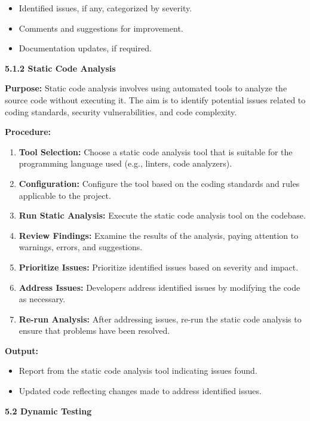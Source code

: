 \documentclass[
]{article}
\begin{document}
\begin{itemize}
\item
  Identified issues, if any, categorized by severity.
\item
  Comments and suggestions for improvement.
\item
  Documentation updates, if required.
\end{itemize}

\textbf{5.1.2 Static Code Analysis}

\textbf{Purpose:} Static code analysis involves using automated tools to
analyze the source code without executing it. The aim is to identify
potential issues related to coding standards, security vulnerabilities,
and code complexity.

\textbf{Procedure:}

\begin{enumerate}
\def\labelenumi{\arabic{enumi}.}
\item
  \textbf{Tool Selection:} Choose a static code analysis tool that is
  suitable for the programming language used (e.g., linters, code
  analyzers).
\item
  \textbf{Configuration:} Configure the tool based on the coding
  standards and rules applicable to the project.
\item
  \textbf{Run Static Analysis:} Execute the static code analysis tool on
  the codebase.
\item
  \textbf{Review Findings:} Examine the results of the analysis, paying
  attention to warnings, errors, and suggestions.
\item
  \textbf{Prioritize Issues:} Prioritize identified issues based on
  severity and impact.
\item
  \textbf{Address Issues:} Developers address identified issues by
  modifying the code as necessary.
\item
  \textbf{Re-run Analysis:} After addressing issues, re-run the static
  code analysis to ensure that problems have been resolved.
\end{enumerate}

\textbf{Output:}

\begin{itemize}
\item
  Report from the static code analysis tool indicating issues found.
\item
  Updated code reflecting changes made to address identified issues.
\end{itemize}

\protect\hypertarget{Ad3}{}{}\textbf{5.2 Dynamic Testing}
\end{document}
